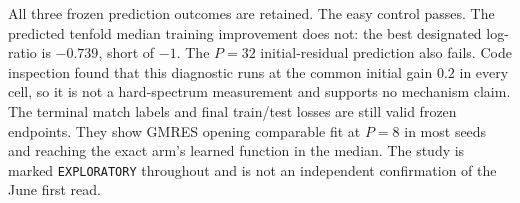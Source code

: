 All three frozen prediction outcomes are retained. The easy control passes.
The predicted tenfold median training improvement does not: the best designated
log-ratio is $-0.739$, short of $-1$. The $P=32$ initial-residual prediction
also fails. Code inspection found that this diagnostic runs at the common
initial gain $0.2$ in every cell, so it is not a hard-spectrum measurement and
supports no mechanism claim. The terminal match labels and final train/test
losses are still valid frozen endpoints. They show GMRES opening comparable
fit at $P=8$ in most seeds and reaching the exact arm's learned function in the
median. The study is marked
\texttt{EXPLORATORY} throughout and is not an independent confirmation of the
June first read.
